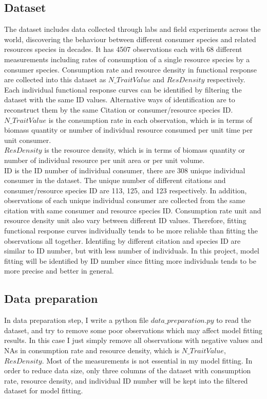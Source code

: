 \documentclass{article}[11pt,a4,twosided,doublespacing,titlepagenumber=on,numbers=endperiod]
\begin{document}
\subsection{Dataset}
The dataset includes data collected through labs and field experiments across the world, discovering the behaviour between different consumer species and related resources species in decades. It has 4507 observations each with 68 different measurements including rates of consumption of a single resource species by a consumer species. Consumption rate and resource density in functional response are collected into this dataset as $N\_TraitValue$ and $ResDensity$ respectively. Each individual functional response curves can be identified by filtering the dataset with the same ID values. Alternative ways of identification are to reconstruct them by the same Citation or consumer/resource species ID.\\
\noindent
$N\_TraitValue$ is the consumption rate in each observation, which is in terms of biomass quantity or number of individual resource consumed per unit time per unit consumer.
\\
\noindent
$ResDensity$ is the resource density, which is in terms of biomass quantity or number of individual resource per unit area or per unit volume. \\
\noindent
ID is the ID number of individual consumer, there are 308 unique individual consumer in the dataset. The unique number of different citations and consumer/resource species ID are 113, 125, and 123 respectively. In addition, observations of each unique individual consumer are collected from the same citation with same consumer and resource species ID. Consumption rate unit and resource density unit also vary between different ID values. Therefore, fitting functional response curves individually tends to be more reliable than fitting the observations all together. Identifing by different citation and species ID are similar to ID number, but with less number of individuals. In this project, model fitting will be identified by ID number since fitting more individuals tends to be more precise and better in general.  

\subsection{Data preparation}
In data preparation step, I write a python file $data\_preparation.py$ to read the dataset, and try to remove some poor observations which may affect model fitting results. In this case I just simply remove all observations with negative values and NAs in consumption rate and resource density, which is $N\_TraitValue$, $ResDensity$. Most of the measurements is not essential in my model fitting. In order to reduce data size, only three columns of the dataset with consumption rate, resource density, and individual ID number will be kept into the filtered dataset for model fitting.
\end{document}
